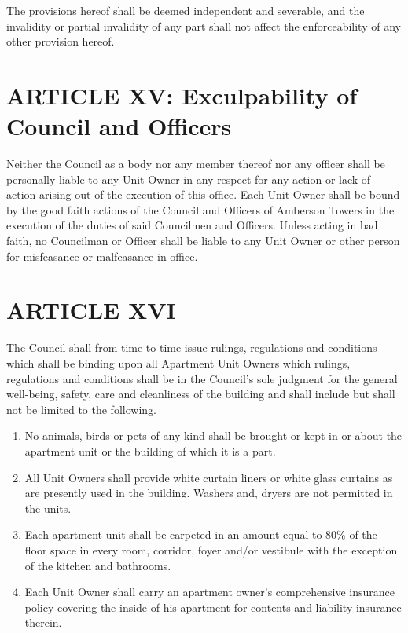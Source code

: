 \documentclass[
]{book}
\providecommand{\tightlist}{%
  \setlength{\itemsep}{0pt}\setlength{\parskip}{0pt}}
\begin{document}
The provisions hereof shall be deemed independent and severable, and the invalidity or partial invalidity of any part shall not affect the enforceability of any other provision hereof.

\hypertarget{article-xv-exculpability-of-council-and-officers}{%
\section*{ARTICLE XV: Exculpability of Council and Officers}\label{article-xv-exculpability-of-council-and-officers}}

Neither the Council as a body nor any member thereof nor any officer shall be personally liable to any Unit Owner in any respect for any action or lack of action arising out of the execution of this office. Each Unit Owner shall be bound by the good faith actions of the Council and Officers of Amberson Towers in the execution of the duties of said Councilmen and Officers. Unless acting in bad faith, no Councilman or Officer shall be liable to any Unit Owner or other person for misfeasance or malfeasance in office.

\hypertarget{article-xvi}{%
\section*{ARTICLE XVI}\label{article-xvi}}

The Council shall from time to time issue rulings, regulations and conditions which shall be binding upon all Apartment Unit Owners which rulings, regulations and conditions shall be in the Council's sole judgment for the general well-being, safety, care and cleanliness of the building and shall include but shall not be limited to the following.

\begin{enumerate}
\def\labelenumi{\arabic{enumi}.}
\tightlist
\item
  No animals, birds or pets of any kind shall be brought or kept in or about the apartment unit or the building of which it is a part.
\item
  All Unit Owners shall provide white curtain liners or white glass curtains as are presently used in the building. Washers and, dryers are not permitted in the units.
\item
  Each apartment unit shall be carpeted in an amount equal to 80\% of the floor space in every room, corridor, foyer and/or vestibule with the exception of the kitchen and bathrooms.
\item
  Each Unit Owner shall carry an apartment owner's comprehensive insurance policy covering the inside of his apartment for contents and liability insurance therein.
\end{enumerate}
\end{document}
